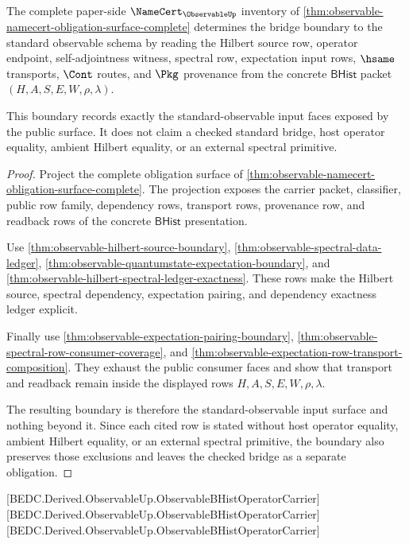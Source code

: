 \begin{theorem}
\label{thm:observable-public-surface-bridge-boundary}
The complete paper-side $\NameCert_{\ObservableUp}$ inventory of
\autoref{thm:observable-namecert-obligation-surface-complete} determines the
bridge boundary to the standard observable schema by reading the Hilbert
source row, operator endpoint, self-adjointness witness, spectral row,
expectation input rows, $\hsame$ transports, $\Cont$ routes, and $\Pkg$
provenance from the concrete $\mathsf{BHist}$ packet
$(H,A,S,E,W,\rho,\lambda)$.

This boundary records exactly the standard-observable input faces exposed by
the public surface. It does not claim a checked standard bridge, host operator
equality, ambient Hilbert equality, or an external spectral primitive.
\end{theorem}
\begin{proof}
Project the complete obligation surface of
\autoref{thm:observable-namecert-obligation-surface-complete}. The projection
exposes the carrier packet, classifier, public row family, dependency rows,
transport rows, provenance row, and readback rows of the concrete
$\mathsf{BHist}$ presentation.

Use \autoref{thm:observable-hilbert-source-boundary},
\autoref{thm:observable-spectral-data-ledger},
\autoref{thm:observable-quantumstate-expectation-boundary}, and
\autoref{thm:observable-hilbert-spectral-ledger-exactness}. These rows make
the Hilbert source, spectral dependency, expectation pairing, and dependency
exactness ledger explicit.

Finally use \autoref{thm:observable-expectation-pairing-boundary},
\autoref{thm:observable-spectral-row-consumer-coverage}, and
\autoref{thm:observable-expectation-row-transport-composition}. They exhaust
the public consumer faces and show that transport and readback remain inside
the displayed rows $H,A,S,E,W,\rho,\lambda$.

The resulting boundary is therefore the standard-observable input surface and
nothing beyond it. Since each cited row is stated without host operator
equality, ambient Hilbert equality, or an external spectral primitive, the
boundary also preserves those exclusions and leaves the checked bridge as a
separate obligation.
\end{proof}

[BEDC.Derived.ObservableUp.ObservableBHistOperatorCarrier]
[BEDC.Derived.ObservableUp.ObservableBHistOperatorCarrier]
[BEDC.Derived.ObservableUp.ObservableBHistOperatorCarrier]

